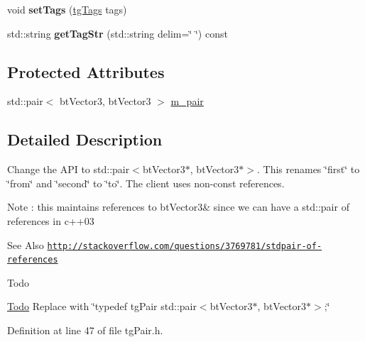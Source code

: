 \begin{DoxyCompactItemize}
\item 
\hypertarget{classtg_taggable_a5492888e4e4da4cca6261070b5726adf}{void {\bfseries set\-Tags} (\hyperlink{classtg_tags}{tg\-Tags} tags)}\label{classtg_taggable_a5492888e4e4da4cca6261070b5726adf}

\item 
\hypertarget{classtg_taggable_a346d66b066d2d9eb1eadba01da43749f}{std\-::string {\bfseries get\-Tag\-Str} (std\-::string delim=\char`\"{} \char`\"{}) const }\label{classtg_taggable_a346d66b066d2d9eb1eadba01da43749f}

\end{DoxyCompactItemize}
\subsection*{Protected Attributes}
\begin{DoxyCompactItemize}
\item 
std\-::pair$<$ bt\-Vector3, bt\-Vector3 $>$ \hyperlink{classtg_pair_ab8d66d088c3bbcce641190dd80a61f5f}{m\-\_\-pair}
\end{DoxyCompactItemize}


\subsection{Detailed Description}
Change the A\-P\-I to std\-::pair$<$bt\-Vector3$\ast$, bt\-Vector3$\ast$$>$. This renames \char`\"{}first\char`\"{} to \char`\"{}from\char`\"{} and \char`\"{}second\char`\"{} to \char`\"{}to\char`\"{}. The client uses non-\/const references. \begin{DoxyNote}{Note}
\-: this maintains references to bt\-Vector3\& since we can have a std\-::pair of references in c++03 
\end{DoxyNote}
\begin{DoxySeeAlso}{See Also}
\href{http://stackoverflow.com/questions/3769781/stdpair-of-references}{\tt http\-://stackoverflow.\-com/questions/3769781/stdpair-\/of-\/references} 
\end{DoxySeeAlso}
\begin{DoxyRefDesc}{Todo}
\item[\hyperlink{todo__todo000087}{Todo}]Replace with \char`\"{}typedef tg\-Pair std\-::pair$<$bt\-Vector3$\ast$, bt\-Vector3$\ast$$>$;\char`\"{} \end{DoxyRefDesc}


Definition at line 47 of file tg\-Pair.\-h.



